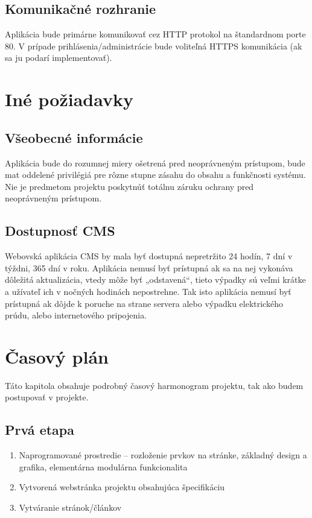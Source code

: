 \documentclass[a4paper,titlepage,11pt]{article}
\begin{document}
\subsection{Komunikačné rozhranie}
Aplikácia bude primárne komunikovať cez HTTP protokol na štandardnom porte 80. V prípade prihlásenia\slash administrácie bude voliteľná HTTPS komunikácia (ak sa ju podarí implementovať).

\newpage
\section{Iné požiadavky}
\subsection{Všeobecné informácie}
Aplikácia bude do rozumnej miery ošetrená pred neoprávneným prístupom, bude mat oddelené privilégiá pre rôzne stupne zásahu do obsahu a funkčnosti systému. Nie je predmetom projektu poskytnúť totálnu záruku ochrany pred neoprávneným prístupom.
 
\subsection{Dostupnosť CMS}
Webovská aplikácia CMS by mala byť dostupná nepretržito 24 hodín, 7 dní v týždni, 365 dní v roku. 
Aplikácia nemusí byť prístupná ak sa na nej vykonáva dôležitá aktualizácia, vtedy môže byť „odstavená“, tieto výpadky sú veľmi krátke a užívateľ ich v nočných hodinách nepostrehne. 
Tak isto aplikácia nemusí byť prístupná ak dôjde k poruche na strane servera alebo výpadku elektrického prúdu, alebo internetového pripojenia.

\newpage
\section{Časový plán}
Táto kapitola obsahuje podrobný časový harmonogram projektu, tak ako budem postupovať v projekte. 

\subsection{Prvá etapa}
\begin{enumerate}
 \item Naprogramované prostredie -- rozloženie prvkov na stránke, základný design a grafika, elementárna modulárna funkcionalita
 \item Vytvorená webstránka projektu obsahujúca špecifikáciu 
 \item Vytváranie stránok\slash článkov
\end{enumerate}
\end{document}
